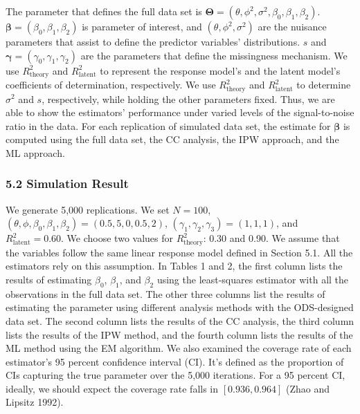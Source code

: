 \documentclass[
  12pt,
]{article}
\begin{document}
The parameter that defines the full data set is
\(\boldsymbol\Theta = (\theta, \phi^2, \sigma^2, \beta_0, \beta_1, \beta_2)\).
\(\boldsymbol\beta = (\beta_0, \beta_1, \beta_2)\) is parameter of
interest, and \((\theta, \phi^2, \sigma^2)\) are the nuisance parameters
that assist to define the predictor variables' distributions. \(s\) and
\(\boldsymbol\gamma = (\gamma_0, \gamma_1, \gamma_2)\) are the
parameters that define the missingness mechanism. We use
\(R_{\mathrm{theory}}^2\) and \(R_{\mathrm{latent}}^2\) to represent the
response model's and the latent model's coefficients of determination,
respectively. We use \(R_{\mathrm{theory}}^2\) and
\(R_{\mathrm{latent}}^2\) to determine \(\sigma^2\) and \(s\),
respectively, while holding the other parameters fixed. Thus, we are
able to show the estimators' performance under varied levels of the
signal-to-noise ratio in the data. For each replication of simulated
data set, the estimate for \(\boldsymbol{\beta}\) is computed using the
full data set, the CC analysis, the IPW approach, and the ML approach.

\hypertarget{simulation-result}{%
\subsubsection{5.2 Simulation Result}\label{simulation-result}}

We generate 5,000 replications. We set \(N = 100\),
\((\theta, \phi, \beta_0, \beta_1, \beta_2) = (0.5, 5, 0, 0.5, 2)\),
\((\gamma_1, \gamma_2, \gamma_3) = (1, 1, 1)\), and
\(R_{\mathrm{latent}}^2 = 0.60\). We choose two values for
\(R_{\mathrm{theory}}^2\): 0.30 and 0.90. We assume that the variables
follow the same linear response model defined in Section 5.1. All the
estimators rely on this assumption. In Tables 1 and 2, the first column
lists the results of estimating \(\beta_0\), \(\beta_1\), and
\(\beta_2\) using the least-squares estimator with all the observations
in the full data set. The other three columns list the results of
estimating the parameter using different analysis methods with the
ODS-designed data set. The second column lists the results of the CC
analysis, the third column lists the results of the IPW method, and the
fourth column lists the results of the ML method using the EM algorithm.
We also examined the coverage rate of each estimator's 95 percent
confidence interval (CI). It's defined as the proportion of CIs
capturing the true parameter over the 5,000 iterations. For a 95 percent
CI, ideally, we should expect the coverage rate falls in
\([0.936, 0.964]\) (Zhao and Lipsitz 1992).
\end{document}
